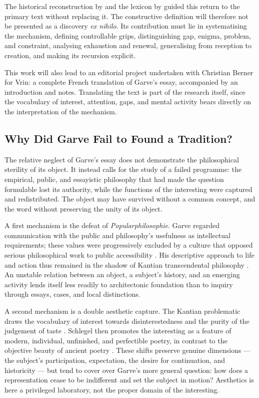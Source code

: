 \documentclass[11pt,a4paper]{article}
\begin{document}
The historical reconstruction by \textcite{nannini2018garve} and the lexicon by
\textcite{nannini2018interesting} guided this return to the primary text without
replacing it. The constructive definition will therefore not be presented as a
discovery \emph{ex nihilo}. Its contribution must lie in systematising the
mechanism, defining controllable grips, distinguishing gap, enigma, problem, and
constraint, analysing exhaustion and renewal, generalising from reception to
creation, and making its recursion explicit.

This work will also lead to an editorial project undertaken with Christian
Berner for Vrin: a complete French translation of Garve's essay,
accompanied by an introduction and notes. Translating the text is part of the
research itself, since the vocabulary of interest, attention, gaps, and mental
activity bears directly on the interpretation of the mechanism.

\subsection{Why Did Garve Fail to Found a Tradition?}

The relative neglect of Garve's essay does not demonstrate the philosophical
sterility of its object. It instead calls for the study of a failed programme:
the empirical, public, and essayistic philosophy that had made the question
formulable lost its authority, while the functions of the interesting were
captured and redistributed. The object may have survived without a common
concept, and the word without preserving the unity of its object.

A first mechanism is the defeat of \emph{Popularphilosophie}. Garve regarded
communication with the public and philosophy's usefulness as intellectual
requirements; these values were progressively excluded by a culture that
opposed serious philosophical work to public accessibility
\parencite{thompson2018garve}. His descriptive approach to life and action thus
remained in the shadow of Kantian transcendental philosophy
\parencite{bachmannmedick2008anziehungskraft}. An unstable relation between an
object, a subject's history, and an emerging activity lends itself less readily
to architectonic foundation than to inquiry through essays, cases, and local
distinctions.

A second mechanism is a double aesthetic capture. The Kantian problematic draws
the vocabulary of interest towards disinterestedness and the purity of the
judgement of taste \parencite{kant1993juger}. Schlegel then promotes the
interesting as a feature of modern, individual, unfinished, and perfectible
poetry, in contrast to the objective beauty of ancient poetry
\parencite{schlegel2001study,nannini2018interesting}. These shifts preserve
genuine dimensions --- the subject's participation, expectation, the desire for
continuation, and historicity --- but tend to cover over Garve's more general
question: how does a representation cease to be indifferent and set the subject
in motion? Aesthetics is here a privileged laboratory, not the proper domain of
the interesting.
\end{document}
